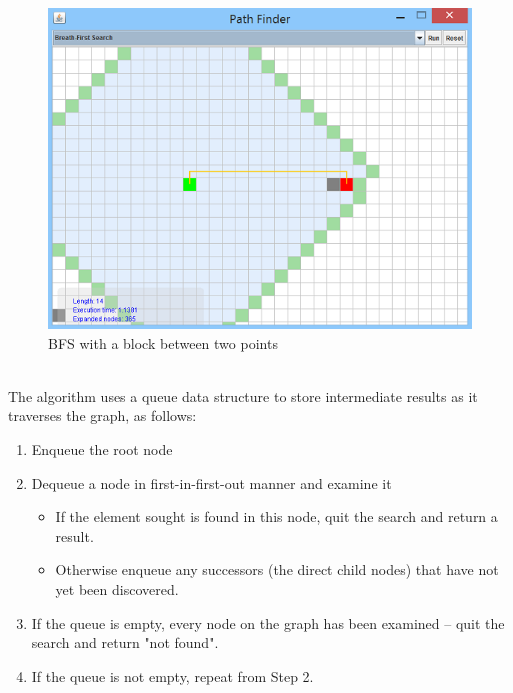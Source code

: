 \documentclass[a4paper]{article}
\begin{document}
\begin{figure}[h!]
  \centering
    \includegraphics[scale=.9]{images/bfs1.png}
  \caption{BFS with a block between two points}
\end{figure}

\noindent \\
The algorithm uses a queue data structure to store intermediate results as it traverses the graph, as follows:\\

\begin{enumerate}
\item Enqueue the root node
\item Dequeue a node in first-in-first-out manner and examine it
	\begin{itemize}
		\item If the element sought is found in this node, quit the search and return a result.
		\item Otherwise enqueue any successors (the direct child nodes) that have not yet been discovered.
	\end{itemize}
\item If the queue is empty, every node on the graph has been examined – quit the search and return "not found". \\
\item If the queue is not empty, repeat from Step 2.
\end{enumerate}

\end{document}
